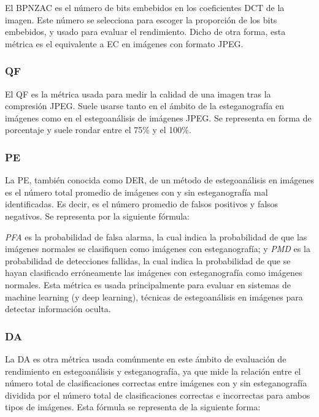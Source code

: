 El \ac{BPNZAC} es el número de bits embebidos en los coeficientes \ac{DCT} de la imagen. Este número se selecciona para escoger la proporción de los bits embebidos, y usado para evaluar el rendimiento. Dicho de otra forma, esta métrica es el equivalente a \ac{EC} en imágenes con formato JPEG. %

\subsubsection{QF}

El \ac{QF} es la métrica usada para medir la calidad de una imagen tras la compresión JPEG. Suele usarse tanto en el ámbito de la esteganografía en imágenes como en el estegoanálisis de imágenes JPEG. Se representa en forma de porcentaje y suele rondar entre el 75\% y el 100\%.

\subsubsection{PE}

La \ac{PE}, también conocida como \ac{DER}, de un método de estegoanálisis en imágenes es el número total promedio de imágenes con y sin esteganografía mal identificadas. Es decir, es el número promedio de falsos positivos y falsos negativos. Se representa por la siguiente fórmula:


\textit{PFA} es la probabilidad de falsa alarma, la cual indica la probabilidad de que las imágenes normales se clasifiquen como imágenes con esteganografía; y \textit{PMD} es la probabilidad de detecciones fallidas, la cual indica la probabilidad de que se hayan clasificado erróneamente las imágenes con esteganografía como imágenes normales. Esta métrica es usada principalmente para evaluar en sistemas de machine learning (y deep learning), técnicas de estegoanálisis en imágenes para detectar información oculta.

\subsubsection{DA}

La \ac{DA} es otra métrica usada comúnmente en este ámbito de evaluación de rendimiento en estegoanálisis y esteganografía, ya que mide la relación entre el número total de clasificaciones correctas entre imágenes con y sin esteganografía dividida por el número total de clasificaciones correctas e incorrectas para ambos tipos de imágenes. Esta fórmula se representa de la siguiente forma:

